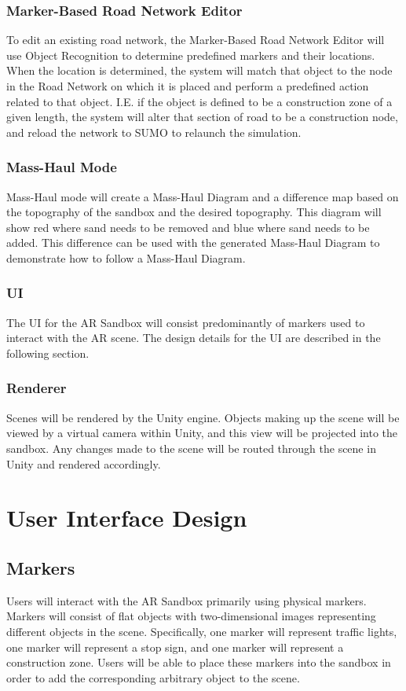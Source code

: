 \documentclass[letterpaper, 10pt, onecolumn, draftclsnofoot]{IEEEtran}
\begin{document}
        \subsubsection{Marker-Based Road Network Editor}
            To edit an existing road network, the Marker-Based Road Network Editor will use Object Recognition to determine predefined markers and their locations. When the location is determined, the system will match that object to the node in the Road Network on which it is placed and perform a predefined action related to that object. I.E. if the object is defined to be a construction zone of a given length, the system will alter that section of road to be a construction node, and reload the network to SUMO to relaunch the simulation. 
        
        \subsubsection{Mass-Haul Mode}
            Mass-Haul mode will create a Mass-Haul Diagram and a difference map based on the topography of the sandbox and the desired topography. This diagram will show red where sand needs to be removed and blue where sand needs to be added. This difference can be used with the generated Mass-Haul Diagram to demonstrate how to follow a Mass-Haul Diagram. 
        
        \subsubsection{UI}
            The UI for the AR Sandbox will consist predominantly of markers used to interact with the AR scene. The design details for the UI are described in the following section.
        
        \subsubsection{Renderer}
            Scenes will be rendered by the Unity engine. Objects making up the scene will be viewed by a virtual camera within Unity, and this view will be projected into the sandbox. Any changes made to the scene will be routed through the scene in Unity and rendered accordingly.
            
\section{User Interface Design}
    \subsection{Markers}
        Users will interact with the AR Sandbox primarily using physical markers. Markers will consist of flat objects with two-dimensional images representing different objects in the scene. Specifically, one marker will represent traffic lights, one marker will represent a stop sign, and one marker will represent a construction zone. Users will be able to place these markers into the sandbox in order to add the corresponding arbitrary object to the scene.
        
\end{document}
